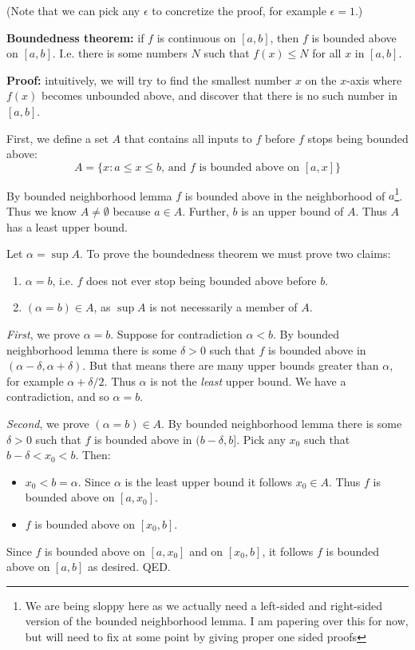 \vs

(Note that we can pick any $\epsilon$ to concretize the proof, for example
$\epsilon=1$.)

\vs


\textbf{Boundedness theorem:} if $f$ is continuous on
$[a,b]$, then $f$ is bounded above on $[a,b]$. I.e. there is some
numbers $N$ such that $f(x)\leq N$ for all $x$ in $[a,b]$.

\vs

\textbf{Proof:} intuitively, we will try to find the smallest number
$x$ on the $x$-axis where $f(x)$ becomes unbounded above, and discover
that there is no such number in $[a,b]$.

\vs

First, we define a set $A$ that contains all inputs to $f$ before $f$
stops being bounded above:
\[A=\{x:a\leq x\leq b \text{, and $f$ is bounded above on $[a,x]$}\}\]

By bounded neighborhood lemma $f$ is bounded above in the neighborhood
of $a$\footnote{We are being sloppy here as we actually need a
  left-sided and right-sided version of the bounded neighborhood
  lemma. I am papering over this for now, but will need to fix at some
  point by giving proper one sided proofs}. Thus we know
$A\neq\emptyset$ because $a\in A$. Further, $b$ is an upper bound of
$A$. Thus $A$ has a least upper bound.

\vs

Let $\alpha=\sup A$. To prove the boundedness theorem we must prove two
claims:
\begin{enumerate}
\item $\alpha=b$, i.e. $f$ does not ever stop being bounded above before
  $b$.
\item $(\alpha=b)\in A$, as $\sup A$ is not necessarily a member of $A$.
\end{enumerate}

\textit{First}, we prove $\alpha=b$. Suppose for contradiction $\alpha<b$. By
bounded neighborhood lemma there is some $\delta>0$ such that $f$ is
bounded above in $(\alpha-\delta, \alpha+\delta)$. But that means there are many upper
bounds greater than $\alpha$, for example $\alpha+\delta/2$. Thus $\alpha$ is not the
\textit{least} upper bound. We have a contradiction, and so $\alpha=b$.

\vs

\textit{Second}, we prove $(\alpha=b)\in A$. By bounded neighborhood lemma
there is some $\delta>0$ such that $f$ is bounded above in $(b-\delta, b]$. Pick
any $x_{0}$ such that $b-\delta<x_{0}<b$. Then:
\begin{itemize}
\item $x_{0}<b=\alpha$. Since $\alpha$ is the least upper bound it follows
  $x_{0}\in A$. Thus $f$ is bounded above on $[a,x_{0}]$.
\item $f$ is bounded above on $[x_{0}, b]$.
\end{itemize}
Since $f$ is bounded above on $[a,x_{0}]$ and on $[x_{0}, b]$, it
follows $f$ is bounded above on $[a,b]$ as desired. QED.

